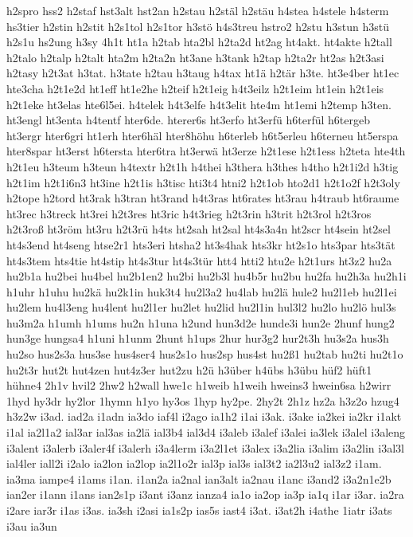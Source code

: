 {h2spro
hss2
h2staf
hst3alt
hst2an
h2stau
h2stäl
h2stäu
h4stea
h4stele
h4sterm
hs3tier
h2stin
h2stit
h2s1tol
h2s1tor
h3stö
h4s3treu
hstro2
h2stu
h3stun
h3stü
h2s1u
hs2ung
h3sy
4h1t
ht1a
h2tab
hta2bl
h2ta2d
ht2ag
ht4akt.
ht4akte
h2tall
h2talo
h2talp
h2talt
hta2m
h2ta2n
ht3ane
h3tank
h2tap
h2ta2r
ht2as
h2t3asi
h2tasy
h2t3at
h3tat.
h3tate
h2tau
h3taug
h4tax
ht1ä
h2tär
h3te.
ht3e4ber
ht1ec
hte3cha
h2t1e2d
ht1eff
ht1e2he
h2teif
h2t1eig
h4t3eilz
h2t1eim
ht1ein
h2t1eis
h2t1eke
ht3elas
hte6l5ei.
h4telek
h4t3elfe
h4t3elit
hte4m
ht1emi
h2temp
h3ten.
ht3engl
ht3enta
h4tentf
hter6de.
hterer6s
ht3erfo
ht3erfü
h6terfül
h6tergeb
ht3ergr
hter6gri
ht1erh
hter6häl
hter8höhu
h6terleb
h6t5erleu
h6terneu
ht5erspa
hter8spar
ht3erst
h6tersta
hter6tra
ht3erwä
ht3erze
h2t1ese
h2t1ess
h2teta
hte4th
h2t1eu
h3teum
h3teun
h4textr
h2t1h
h4thei
h3thera
h3thes
h4tho
h2t1i2d
h3tig
h2t1im
h2t1i6n3
ht3ine
h2t1is
h3tisc
hti3t4
htni2
h2t1ob
hto2d1
h2t1o2f
h2t3oly
h2tope
h2tord
ht3rak
h3tran
ht3rand
h4t3ras
ht6rates
ht3rau
h4traub
ht6raume
ht3rec
h3treck
ht3rei
h2t3res
ht3ric
h4t3rieg
h2t3rin
h3trit
h2t3rol
h2t3ros
h2t3roß
ht3röm
ht3ru
h2t3rü
h4ts
ht2sah
ht2sal
ht4s3a4n
ht2scr
ht4sein
ht2sel
ht4s3end
ht4seng
htse2r1
hts3eri
htsha2
ht3s4hak
hts3kr
ht2s1o
hts3par
hts3tät
ht4s3tem
hts4tie
ht4stip
ht4s3tur
ht4s3tür
htt4
htti2
htu2e
h2t1urs
ht3z2
hu2a
hu2b1a
hu2bei
hu4bel
hu2b1en2
hu2bi
hu2b3l
hu4b5r
hu2bu
hu2fa
hu2h3a
hu2h1i
h1uhr
h1uhu
hu2kä
hu2k1in
huk3t4
hu2l3a2
hu4lab
hu2lä
hule2
hu2l1eb
hu2l1ei
hu2lem
hu4l3eng
hu4lent
hu2l1er
hu2let
hu2lid
hu2l1in
hul3l2
hu2lo
hu2lö
hul3s
hu3m2a
h1umh
h1ums
hu2n
h1una
h2und
hun3d2e
hunde3i
hun2e
2hunf
hung2
hun3ge
hungsa4
h1uni
h1unm
2hunt
h1ups
2hur
hur3g2
hur2t3h
hu3s2a
hus3h
hu2so
hus2s3a
hus3se
hus4ser4
hus2s1o
hus2sp
hus4st
hu2ß1
hu2tab
hu2ti
hu2t1o
hu2t3r
hut2t
hut4zen
hut4z3er
hut2zu
h2ü
h3über
h4übs
h3übu
hüf2
hüft1
hühne4
2h1v
hvil2
2hw2
h2wall
hwe1c
h1weib
h1weih
hweins3
hwein6sa
h2wirr
1hyd
hy3dr
hy2lor
1hymn
h1yo
hy3os
1hyp
hy2pe.
2hy2t
2h1z
hz2a
h3z2o
hzug4
h3z2w
i3ad.
iad2a
i1adn
ia3do
iaf4l
i2ago
ia1h2
i1ai
i3ak.
i3ake
ia2kei
ia2kr
i1akt
i1al
ia2l1a2
ial3ar
ial3as
ia2lä
ial3b4
ial3d4
i3aleb
i3alef
i3alei
ia3lek
i3alel
i3aleng
i3alent
i3alerb
i3aler4f
i3alerh
i3a4lerm
i3a2l1et
i3alex
i3a2lia
i3alim
i3a2lin
i3al3l
ial4ler
iall2i
i2alo
ia2lon
ia2lop
ia2l1o2r
ial3p
ial3s
ial3t2
ia2l3u2
ial3z2
i1am.
ia3ma
iampe4
i1ams
i1an.
i1an2a
ia2nal
ian3alt
ia2nau
i1anc
i3and2
i3a2n1e2b
ian2er
i1ann
i1ans
ian2s1p
i3ant
i3anz
ianza4
ia1o
ia2op
ia3p
ia1q
i1ar
i3ar.
ia2ra
i2are
iar3r
i1as
i3as.
ia3sh
i2asi
ia1s2p
ias5s
iast4
i3at.
i3at2h
i4athe
1iatr
i3ats
i3au
ia3un
}
